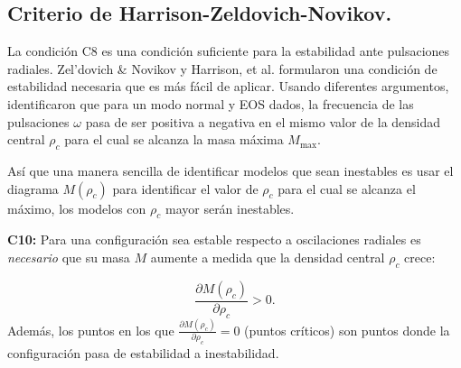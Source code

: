\subsection*{Criterio de Harrison-Zeldovich-Novikov.}

\noindent La condición C8 es una condición suficiente para la estabilidad ante pulsaciones radiales. Zel'dovich \& Novikov \cite{Zeldovich1971} y Harrison, et al. \cite{Harrison1965} formularon una condición de estabilidad necesaria que es más fácil de aplicar. Usando diferentes argumentos, identificaron que para un modo normal y EOS dados, la frecuencia de las pulsaciones $\omega$ pasa de ser positiva a negativa en el mismo valor de la densidad central $\rho_c$ para el cual se alcanza la masa máxima $M_{\text{max}}$. 

Así que una manera sencilla de identificar modelos que sean inestables es usar el diagrama $M(\rho_c)$ para identificar el valor de $\rho_c$ para el cual se alcanza el máximo, los modelos con $\rho_c$ mayor serán inestables. 

\textbf{C10:} Para una configuración sea estable respecto a oscilaciones radiales es \emph{necesario} que su masa $M$ aumente a medida que la densidad central $\rho_{c}$ crece: 

\begin{equation}
    \frac { \partial M \left( \rho _ { c } \right) } { \partial \rho _ { c } } > 0.
\end{equation}
Además, los puntos en los que $\frac { \partial M \left( \rho _ { c } \right) } { \partial \rho _ { c } } = 0$ (puntos críticos) son puntos donde la configuración pasa de estabilidad a inestabilidad.



